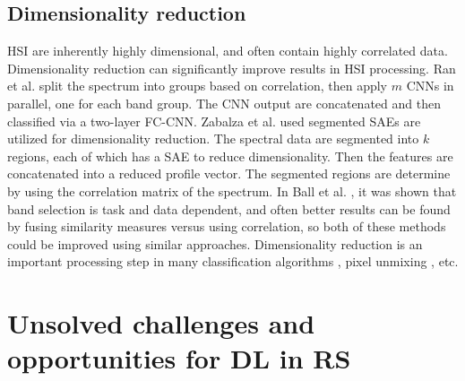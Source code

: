 \documentclass[12pt]{spieman}
\newcommand{\ParSection}[1]{}
\begin{document}
\begin{spacing}{1}
\subsection{Dimensionality reduction}
\ParSection{(JOHN-DONE)}

HSI are inherently highly dimensional, and often contain highly correlated data. Dimensionality reduction can significantly improve results in HSI processing. Ran et al. \cite{ran2016bands} split the spectrum into groups based on correlation, then apply $m$ CNNs in parallel, one for each band group. The CNN output are concatenated and then classified via a two-layer FC-CNN. Zabalza et al. \cite{Zabalza2016Novel} used segmented SAEs are utilized for dimensionality reduction. The spectral data are segmented into $k$ regions, each of which has a SAE to reduce dimensionality. Then the features are concatenated into a reduced profile vector. The segmented regions are determine by using the correlation matrix of the spectrum. In Ball et al. \cite{ball2014hyperspectral} , it was shown that band selection is task and data dependent, and often better results can be found by fusing similarity measures versus using correlation, so both of these methods could be improved using similar approaches. Dimensionality reduction is an important processing step in many classification algorithms \cite{Ball2007LevelSetBBA, Ball2007LevelSetSID} , pixel unmixing \cite{keshava2003survey, keshava2002spectral, anderson2012spectral, winter2000comparison, charles2011learning, romero2014unsupervised, ball2007hyperspectral} , etc.

%
%
\section{Unsolved challenges and opportunities for DL in RS}
\label{sec:ChallengesOpportunitiesDLRS}


\end{spacing}
\end{document}
